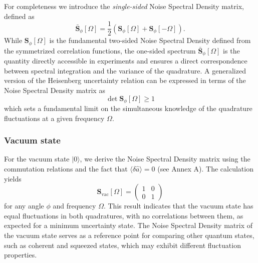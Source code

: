 For completeness we introduce the \textit{single-sided} Noise Spectral Density matrix, defined as
\begin{equation}
  \mathbf{\bar S}_{\phi}[\Omega]= \dfrac{1}{2} (\mathbf{S}_{\phi}[\Omega]+ \mathbf{S}_{\phi}[-\Omega]).
\end{equation}
\noindent
While $\mathbf{S}_{\phi} [\Omega]$ is the fundamental two-sided Noise Spectral Density defined from the symmetrized correlation functions, the one-sided spectrum $\mathbf{\bar S}_{\phi}[\Omega]$ is the quantity directly accessible in experiments and ensures a direct correspondence between spectral integration and the variance of the quadrature. A generalized version of the Heisenberg uncertainty relation can be expressed in terms of the Noise Spectral Density matrix as
\begin{equation}
  \det \mathbf{S}_{\phi}[\Omega] \geq 1
\end{equation}
which sets a fundamental limit on the simultaneous knowledge of the quadrature fluctuations at a given frequency \(\Omega\). 
\subsubsection{Vacuum state}
For the vacuum state \(|0\rangle\), we derive the Noise Spectral Density matrix using the commutation relations and the fact that \(\langle \delta \hat{a}  \rangle = 0\) (see Annex A). The calculation yields
\begin{equation}
\mathbf{S}_{\text{vac}}[\Omega] =
\begin{pmatrix}
1 & 0 \\
0 & 1
\end{pmatrix}
\end{equation}
for any angle \(\phi\) and frequency \(\Omega\). This result indicates that the vacuum state has equal fluctuations in both quadratures, with no correlations between them, as expected for a minimum uncertainty state. The Noise Spectral Density matrix of the vacuum state serves as a reference point for comparing other quantum states, such as coherent and squeezed states, which may exhibit different fluctuation properties.

